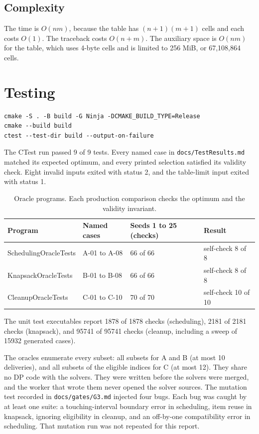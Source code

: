 \documentclass[11pt]{article}
\begin{document}
\subsection{Complexity}

The time is $O(nm)$, because the table has $(n+1)(m+1)$ cells and each costs $O(1)$. The traceback
costs $O(n+m)$. The auxiliary space is $O(nm)$ for the table, which uses 4-byte cells and is limited
to 256 MiB, or 67,108,864 cells.

\section{Testing}

\begin{lstlisting}
cmake -S . -B build -G Ninja -DCMAKE_BUILD_TYPE=Release
cmake --build build
ctest --test-dir build --output-on-failure
\end{lstlisting}

The CTest run passed 9 of 9 tests. Every named case in \texttt{docs/TestResults.md} matched its
expected optimum, and every printed selection satisfied its validity check. Eight invalid inputs
exited with status 2, and the table-limit input exited with status 1.

\begin{table}[h]
\centering
\begin{tabular}{llll}
\toprule
Program & Named cases & Seeds 1 to 25 (checks) & Result \\
\midrule
SchedulingOracleTests & A-01 to A-08 & 66 of 66 & self-check 8 of 8 \\
KnapsackOracleTests & B-01 to B-08 & 66 of 66 & self-check 8 of 8 \\
CleanupOracleTests & C-01 to C-10 & 70 of 70 & self-check 10 of 10 \\
\bottomrule
\end{tabular}
\caption{Oracle programs. Each production comparison checks the optimum and the validity invariant.}
\end{table}

The unit test executables report 1878 of 1878 checks (scheduling), 2181 of 2181 checks
(knapsack), and 95741 of 95741 checks (cleanup, including a sweep of 15932 generated cases).

The oracles enumerate every subset: all subsets for A and B (at most 10 deliveries), and all subsets
of the eligible indices for C (at most 12). They share no DP code with the solvers. They were
written before the solvers were merged, and the worker that wrote them never opened the solver
sources. The mutation test recorded in \texttt{docs/gates/G3.md} injected four bugs. Each bug was
caught by at least one suite: a touching-interval boundary error in scheduling, item reuse in
knapsack, ignoring eligibility in cleanup, and an off-by-one compatibility error in scheduling. That
mutation run was not repeated for this report.
\end{document}
